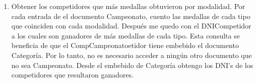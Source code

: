 \begin{enumerate}
\item Obtener los competidores que más medallas obtuvieron por modalidad. Por cada entrada de el documento Campeonato,
cuento las medallas de cada tipo que coinciden con cada modalidad. Después me quedo con el DNICompetidor a los cuales
son ganadores de más medallas de cada tipo. Esta consulta se beneficia de que el CompCampeonatoetidor tiene embebido
el documento Categoría. Por lo tanto, no es necesario acceder a ningún otro documento que no sea Campeonato. Desde el embebido
 de Categoría obtengo los DNI's de los competidores que resultaron ganadores.

\end{enumerate}
